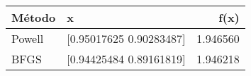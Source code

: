 \begin{tabular}{llr}
\toprule
Método & x & f(x) \\
\midrule
Powell & [0.95017625 0.90283487] & 1.946560 \\
BFGS & [0.94425484 0.89161819] & 1.946218 \\
\bottomrule
\end{tabular}
